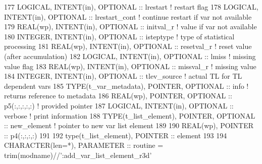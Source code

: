 \begin{DoxyCode}
177     \textcolor{keywordtype}{LOGICAL},              \textcolor{keywordtype}{INTENT(in)}, \textcolor{keywordtype}{OPTIONAL} :: lrestart            \textcolor{comment}{! restart flag}
178     \textcolor{keywordtype}{LOGICAL},              \textcolor{keywordtype}{INTENT(in)}, \textcolor{keywordtype}{OPTIONAL} :: lrestart\_cont       \textcolor{comment}{! continue restart if var not
       available}
179     \textcolor{keywordtype}{REAL(wp)},             \textcolor{keywordtype}{INTENT(in)}, \textcolor{keywordtype}{OPTIONAL} :: initval\_r           \textcolor{comment}{! value if var not available}
180     \textcolor{keywordtype}{INTEGER},              \textcolor{keywordtype}{INTENT(in)}, \textcolor{keywordtype}{OPTIONAL} :: isteptype           \textcolor{comment}{! type of statistical processing}
181     \textcolor{keywordtype}{REAL(wp)},             \textcolor{keywordtype}{INTENT(in)}, \textcolor{keywordtype}{OPTIONAL} :: resetval\_r          \textcolor{comment}{! reset value (after accumulation)}
182     \textcolor{keywordtype}{LOGICAL},              \textcolor{keywordtype}{INTENT(in)}, \textcolor{keywordtype}{OPTIONAL} :: lmiss               \textcolor{comment}{! missing value flag}
183     \textcolor{keywordtype}{REAL(wp)},             \textcolor{keywordtype}{INTENT(in)}, \textcolor{keywordtype}{OPTIONAL} :: missval\_r           \textcolor{comment}{! missing value}
184     \textcolor{keywordtype}{INTEGER},              \textcolor{keywordtype}{INTENT(in)}, \textcolor{keywordtype}{OPTIONAL} :: tlev\_source         \textcolor{comment}{! actual TL for TL dependent vars}
185     \textcolor{keywordtype}{TYPE}(t\_var\_metadata), \textcolor{keywordtype}{POINTER},    \textcolor{keywordtype}{OPTIONAL} :: info                \textcolor{comment}{! returns reference to metadata}
186     \textcolor{keywordtype}{REAL(wp)},             \textcolor{keywordtype}{POINTER},    \textcolor{keywordtype}{OPTIONAL} :: p5(:,:,:,:,:)       \textcolor{comment}{! provided pointer}
187     \textcolor{keywordtype}{LOGICAL},              \textcolor{keywordtype}{INTENT(in)}, \textcolor{keywordtype}{OPTIONAL} :: verbose             \textcolor{comment}{! print information}
188     \textcolor{keywordtype}{TYPE}(t\_list\_element), \textcolor{keywordtype}{POINTER}, \textcolor{keywordtype}{OPTIONAL}  :: new\_element           \textcolor{comment}{! pointer to new var list element}
189 
190     \textcolor{keywordtype}{REAL(wp)}, \textcolor{keywordtype}{POINTER} :: p4(:,:,:,:)
191 
192     type(t\_list\_element), \textcolor{keywordtype}{POINTER} :: element
193 
194     \textcolor{keywordtype}{CHARACTER(len=*)}, \textcolor{keywordtype}{PARAMETER} :: routine = trim(modname)//\textcolor{stringliteral}{':add\_var\_list\_element\_r3d'}

\end{DoxyCode}
